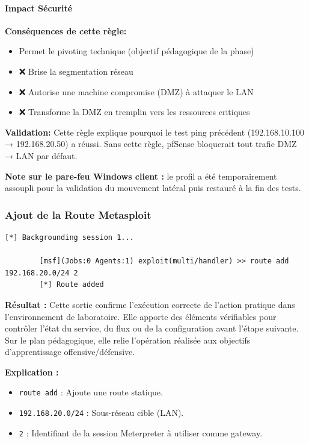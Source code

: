 \documentclass[12pt,a4paper,openany]{report}
\begin{document}
	\paragraph{Impact Sécurité}
	
	\textbf{Conséquences de cette règle:}
	\begin{itemize}
		\item \textcolor{green}{\checkmark} Permet le pivoting technique (objectif pédagogique de la phase)
		\item ❌ Brise la segmentation réseau
		\item ❌ Autorise une machine compromise (DMZ) à attaquer le LAN
		\item ❌ Transforme la DMZ en tremplin vers les ressources critiques
	\end{itemize}
	
	\textbf{Validation:} Cette règle explique pourquoi le test ping précédent
	(192.168.10.100 → 192.168.20.50) a réussi. Sans cette règle, pfSense
	bloquerait tout trafic DMZ → LAN par défaut.
	
	\textbf{Note sur le pare-feu Windows client :} le profil a été temporairement assoupli pour la validation du mouvement latéral puis restauré à la fin des tests.
	
	\subsubsection{Ajout de la Route Metasploit}
	
	\begin{lstlisting}[caption=Configuration du Routage]
		[*] Backgrounding session 1...
		
		[msf](Jobs:0 Agents:1) exploit(multi/handler) >> route add 192.168.20.0/24 2
		[*] Route added
	\end{lstlisting}
	
	\textbf{Résultat :} Cette sortie confirme l'exécution correcte de l'action pratique dans l'environnement de laboratoire. Elle apporte des éléments vérifiables pour contrôler l'état du service, du flux ou de la configuration avant l'étape suivante. Sur le plan pédagogique, elle relie l'opération réalisée aux objectifs d'apprentissage offensive/défensive.
	
	
	\textbf{Explication :}
	\begin{itemize}
		\item \texttt{route add} : Ajoute une route statique.
		\item \texttt{192.168.20.0/24} : Sous-réseau cible (LAN).
		\item \texttt{2} : Identifiant de la session Meterpreter à utiliser comme gateway.
	\end{itemize}
	
\end{document}
